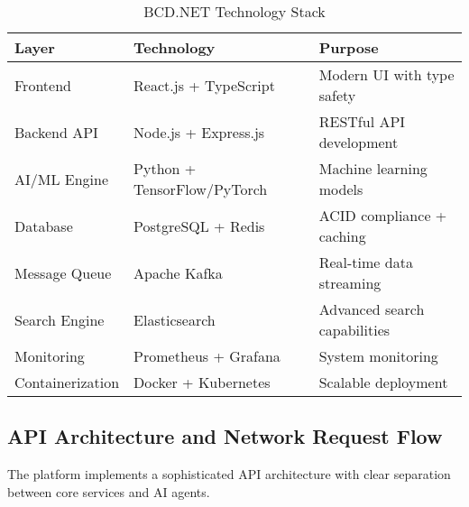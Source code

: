\begin{table}[h]
\centering
\begin{tabular}{|l|l|l|}
\hline
\textbf{Layer} & \textbf{Technology} & \textbf{Purpose} \\
\hline
Frontend & React.js + TypeScript & Modern UI with type safety \\
Backend API & Node.js + Express.js & RESTful API development \\
AI/ML Engine & Python + TensorFlow/PyTorch & Machine learning models \\
Database & PostgreSQL + Redis & ACID compliance + caching \\
Message Queue & Apache Kafka & Real-time data streaming \\
Search Engine & Elasticsearch & Advanced search capabilities \\
Monitoring & Prometheus + Grafana & System monitoring \\
Containerization & Docker + Kubernetes & Scalable deployment \\
\hline
\end{tabular}
\caption{BCD.NET Technology Stack}
\label{tab:technology-stack}
\end{table}

\subsection{API Architecture and Network Request Flow}

The platform implements a sophisticated API architecture with clear separation between core services and AI agents.

